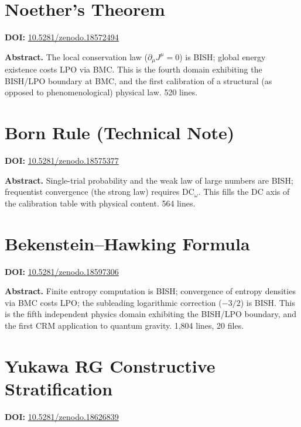 \documentclass[11pt,a4paper]{article}
\begin{document}
\section{Noether's Theorem}
\label{sec:p15}
\textbf{DOI:} \href{https://doi.org/10.5281/zenodo.18572494}{10.5281/zenodo.18572494}

\bigskip
\noindent\textbf{Abstract.}
The local conservation law ($\partial_\mu J^\mu=0$) is BISH; global energy existence costs LPO via BMC. This is the fourth domain exhibiting the BISH/LPO boundary at BMC, and the first calibration of a structural (as opposed to phenomenological) physical law.  520 lines.

\section{Born Rule (Technical Note)}
\label{sec:p16}
\textbf{DOI:} \href{https://doi.org/10.5281/zenodo.18575377}{10.5281/zenodo.18575377}

\bigskip
\noindent\textbf{Abstract.}
Single-trial probability and the weak law of large numbers are BISH; frequentist convergence (the strong law) requires $\mathrm{DC}_\omega$. This fills the DC axis of the calibration table with physical content. 564 lines.

\section{Bekenstein--Hawking Formula}
\label{sec:p17}
\textbf{DOI:} \href{https://doi.org/10.5281/zenodo.18597306}{10.5281/zenodo.18597306}

\bigskip
\noindent\textbf{Abstract.}
Finite entropy computation is BISH; convergence of entropy densities via BMC costs LPO; the subleading logarithmic correction ($-3/2$) is BISH. This is the fifth independent physics domain exhibiting the BISH/LPO boundary, and the first CRM application to quantum gravity. 1,804 lines, 20 files.

\section{Yukawa RG Constructive Stratification}
\label{sec:p18}
\textbf{DOI:} \href{https://doi.org/10.5281/zenodo.18626839}{10.5281/zenodo.18626839}
\end{document}
